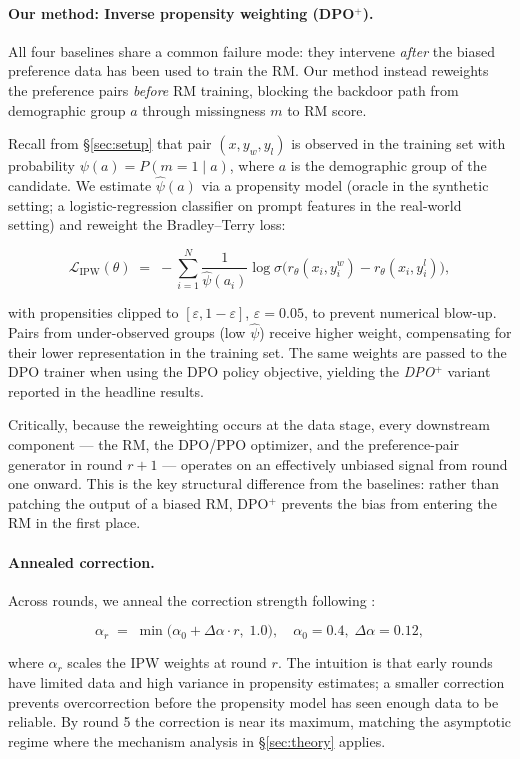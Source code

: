 \paragraph{Our method: Inverse propensity weighting (DPO$^+$).}
All four baselines share a common failure mode: they intervene \emph{after} the
biased preference data has been used to train the RM.
Our method instead reweights the preference pairs \emph{before} RM training,
blocking the backdoor path from demographic group $a$ through
missingness $m$ to RM score.

Recall from \S\ref{sec:setup} that pair $(x, y_w, y_l)$ is observed in the
training set with probability $\psi(a) = P(m{=}1 \mid a)$, where $a$ is the
demographic group of the candidate.
We estimate $\hat\psi(a)$ via a propensity model (oracle in the synthetic
setting; a logistic-regression classifier on prompt features in the real-world
setting) and reweight the Bradley--Terry loss:

\begin{equation}
    \mathcal{L}_{\mathrm{IPW}}(\theta) \;=\;
    -\sum_{i=1}^{N}
    \frac{1}{\hat\psi(a_i)}
    \log \sigma\!\bigl(r_\theta(x_i, y_i^w) - r_\theta(x_i, y_i^l)\bigr),
\label{eq:ipw}
\end{equation}

with propensities clipped to $[\varepsilon, 1{-}\varepsilon]$,
$\varepsilon = 0.05$, to prevent numerical blow-up.
Pairs from under-observed groups (low $\hat\psi$) receive higher weight,
compensating for their lower representation in the training set.
The same weights are passed to the DPO trainer when using the DPO policy
objective, yielding the \emph{DPO$^+$} variant reported in the headline results.

Critically, because the reweighting occurs at the data stage, every downstream
component — the RM, the DPO/PPO optimizer, and the preference-pair generator
in round $r{+}1$ — operates on an effectively unbiased signal from round one
onward.
This is the key structural difference from the baselines: rather than patching
the output of a biased RM, DPO$^+$ prevents the bias from entering the RM in
the first place.

\paragraph{Annealed correction.}
Across rounds, we anneal the correction strength following
\citet{kim2025cpm}:

\begin{equation}
    \alpha_r \;=\; \min\!\bigl(\alpha_0 + \Delta\alpha \cdot r,\; 1.0\bigr),
    \quad \alpha_0 = 0.4,\; \Delta\alpha = 0.12,
\label{eq:anneal}
\end{equation}

where $\alpha_r$ scales the IPW weights at round $r$.
The intuition is that early rounds have limited data and high variance in
propensity estimates; a smaller correction prevents overcorrection before the
propensity model has seen enough data to be reliable.
By round 5 the correction is near its maximum, matching the asymptotic regime
where the mechanism analysis in \S\ref{sec:theory} applies.

